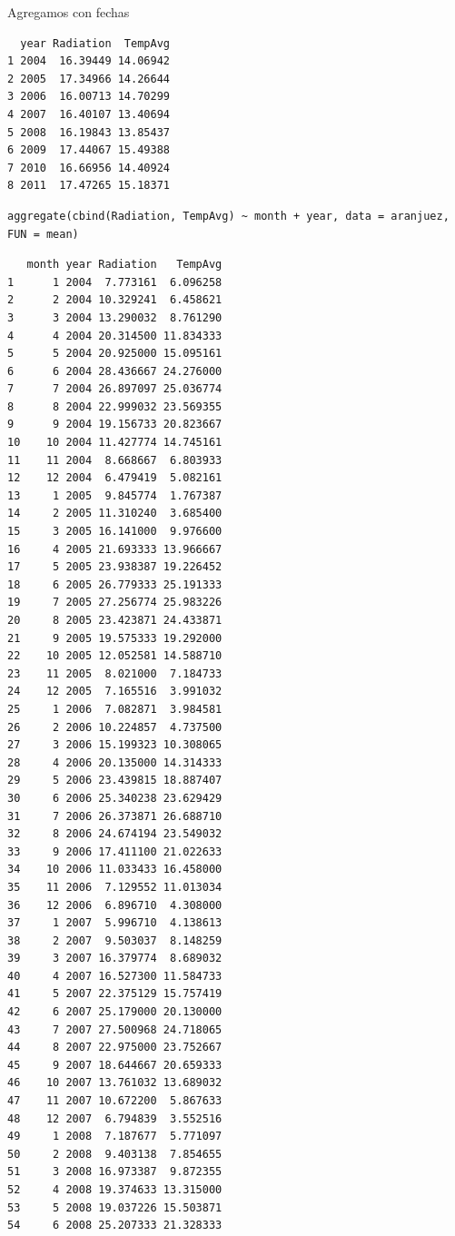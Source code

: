 \documentclass[xcolor={usenames,svgnames,dvipsnames}]{beamer}
\begin{document}
\begin{frame}[fragile,label=sec-5-2-4]{Agregamos con fechas}
\begin{verbatim}
  year Radiation  TempAvg
1 2004  16.39449 14.06942
2 2005  17.34966 14.26644
3 2006  16.00713 14.70299
4 2007  16.40107 13.40694
5 2008  16.19843 13.85437
6 2009  17.44067 15.49388
7 2010  16.66956 14.40924
8 2011  17.47265 15.18371
\end{verbatim}

\lstset{language=R,label= ,caption= ,numbers=none}
\begin{lstlisting}
aggregate(cbind(Radiation, TempAvg) ~ month + year, data = aranjuez, FUN = mean)
\end{lstlisting}

\begin{verbatim}
   month year Radiation   TempAvg
1      1 2004  7.773161  6.096258
2      2 2004 10.329241  6.458621
3      3 2004 13.290032  8.761290
4      4 2004 20.314500 11.834333
5      5 2004 20.925000 15.095161
6      6 2004 28.436667 24.276000
7      7 2004 26.897097 25.036774
8      8 2004 22.999032 23.569355
9      9 2004 19.156733 20.823667
10    10 2004 11.427774 14.745161
11    11 2004  8.668667  6.803933
12    12 2004  6.479419  5.082161
13     1 2005  9.845774  1.767387
14     2 2005 11.310240  3.685400
15     3 2005 16.141000  9.976600
16     4 2005 21.693333 13.966667
17     5 2005 23.938387 19.226452
18     6 2005 26.779333 25.191333
19     7 2005 27.256774 25.983226
20     8 2005 23.423871 24.433871
21     9 2005 19.575333 19.292000
22    10 2005 12.052581 14.588710
23    11 2005  8.021000  7.184733
24    12 2005  7.165516  3.991032
25     1 2006  7.082871  3.984581
26     2 2006 10.224857  4.737500
27     3 2006 15.199323 10.308065
28     4 2006 20.135000 14.314333
29     5 2006 23.439815 18.887407
30     6 2006 25.340238 23.629429
31     7 2006 26.373871 26.688710
32     8 2006 24.674194 23.549032
33     9 2006 17.411100 21.022633
34    10 2006 11.033433 16.458000
35    11 2006  7.129552 11.013034
36    12 2006  6.896710  4.308000
37     1 2007  5.996710  4.138613
38     2 2007  9.503037  8.148259
39     3 2007 16.379774  8.689032
40     4 2007 16.527300 11.584733
41     5 2007 22.375129 15.757419
42     6 2007 25.179000 20.130000
43     7 2007 27.500968 24.718065
44     8 2007 22.975000 23.752667
45     9 2007 18.644667 20.659333
46    10 2007 13.761032 13.689032
47    11 2007 10.672200  5.867633
48    12 2007  6.794839  3.552516
49     1 2008  7.187677  5.771097
50     2 2008  9.403138  7.854655
51     3 2008 16.973387  9.872355
52     4 2008 19.374633 13.315000
53     5 2008 19.037226 15.503871
54     6 2008 25.207333 21.328333

\end{verbatim}
\end{frame}
\end{document}
